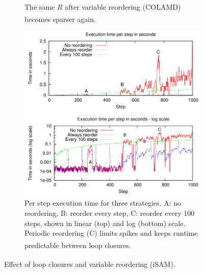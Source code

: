 \begin{figure}[H]
\begin{minipage}[t]{0.48\linewidth}
\begin{subfigure}[t]{0.49\linewidth}
            \caption{The same $R$ after variable reordering (\gls{COLAMD}) becomes sparser again.\textsuperscript{\cite{iSAM_paper}}}\label{fig:l-bot-right}
        \end{subfigure}
    \end{minipage}\hfill
    \begin{minipage}[t]{0.49\linewidth}
        \vspace{0pt}
        \begin{subfigure}[t]{\linewidth}
            \centering
            \includegraphics[width=\linewidth,height=0.98\textheight,keepaspectratio]{Pictures/Optimizers/iSAM/Variable_Reordering4.png}
            \caption{Per step execution time for three strategies. A: no reordering, B: reorder every step, C: reorder every 100 steps, shown in linear (top) and log (bottom) scale. Periodic reordering (C) limits spikes and keeps runtime predictable between loop closures.\textsuperscript{\cite{iSAM_paper}}}\label{fig:r-full}
        \end{subfigure}
    \end{minipage}

    \caption{Effect of loop closures and variable reordering (iSAM).\textsuperscript{\cite{iSAM_paper}}}
    \label{fig:variable-reordering}
\end{figure}
\noindent
